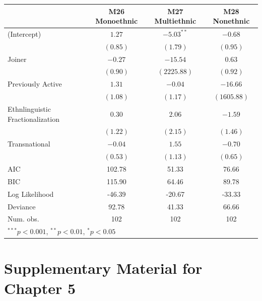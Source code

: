 \documentclass[12pt,]{book}
\let\origtable\table
\let\endorigtable\endtable
\renewenvironment{table}[1][2] {
    \singlespacing
    \expandafter\origtable\expandafter[H]
} {
    \endorigtable
}
\theoremstyle{definition}
\theoremstyle{definition}
\theoremstyle{definition}
\theoremstyle{remark}
\begin{document}
\begin{table}
\begin{center}
\begin{tabular}{l c c c }
\hline
 & M26 Monoethnic & M27 Multiethnic & M28 Nonethnic \\
\hline
(Intercept)                      & $1.27$   & $-5.03^{**}$ & $-0.68$     \\
                                 & $(0.85)$ & $(1.79)$     & $(0.95)$    \\
Joiner                           & $-0.27$  & $-15.54$     & $0.63$      \\
                                 & $(0.90)$ & $(2225.88)$  & $(0.92)$    \\
Previously Active                & $1.31$   & $-0.04$      & $-16.66$    \\
                                 & $(1.08)$ & $(1.17)$     & $(1605.88)$ \\
Ethnlinguistic Fractionalization & $0.30$   & $2.06$       & $-1.59$     \\
                                 & $(1.22)$ & $(2.15)$     & $(1.46)$    \\
Transnational                    & $-0.04$  & $1.55$       & $-0.70$     \\
                                 & $(0.53)$ & $(1.13)$     & $(0.65)$    \\
\hline
AIC                              & 102.78   & 51.33        & 76.66       \\
BIC                              & 115.90   & 64.46        & 89.78       \\
Log Likelihood                   & -46.39   & -20.67       & -33.33      \\
Deviance                         & 92.78    & 41.33        & 66.66       \\
Num. obs.                        & 102      & 102          & 102         \\
\hline
\multicolumn{4}{l}{\scriptsize{$^{***}p<0.001$, $^{**}p<0.01$, $^*p<0.05$}}
\end{tabular}
\caption{Logit Models of Rebel Group Ethnic Composition (Secessionist Conflicts Only)}
\label{tab:comp-sec}
\end{center}
\end{table}

\hypertarget{supplementary-material-for-chapter-5}{%
\section*{Supplementary Material for Chapter
5}\label{supplementary-material-for-chapter-5}}
\end{document}
